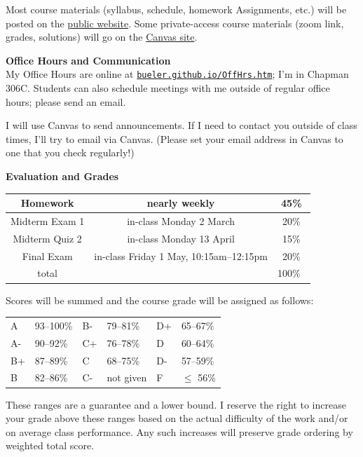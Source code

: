 \documentclass[12pt]{article}
\renewcommand{\emph}[1]{\textsf{\textbf{#1}}}
\newcommand{\localhead}[1]{\par\smallskip\textbf{#1} \smallskip\nobreak\\}%
\def\heading#1{\localhead{\large\emph{#1}}}
\begin{document}
Most course materials (syllabus, schedule, homework Assignments, etc.) will be posted on the \href{https://bueler.github.io/fa/}{public website}.  Some private-access course materials (zoom link, grades, solutions) will go on the \href{https://canvas.alaska.edu/courses/30068}{Canvas site}.


\heading{Office Hours and Communication}
My Office Hours are online at \href{http://bueler.github.io/OffHrs.htm}{\texttt{bueler.github.io/OffHrs.htm}}; I'm in Chapman 306C.  Students can also schedule meetings with me outside of regular office hours; please send an email.

I will use Canvas to send announcements.  If I need to contact you outside of class times, I'll try to email via Canvas.  (Please set your email address in Canvas to one that you check regularly!)


\clearpage\newpage
\phantom{foo}
\vskip -20pt

\heading{Evaluation and Grades}

\begin{tabular}{|c|c|c|}
\hline
Homework & nearly weekly & {\color{red} 45\%} \\
\hline
Midterm Exam 1 & in-class Monday 2 March  & 20\%  \\
\hline
Midterm {\color{red} Quiz} 2 & in-class Monday 13 April & {\color{red} 15\%}  \\
\hline
Final Exam     & in-class Friday 1 May, 10:15am--12:15pm & 20\% \\
\hline
total & & 100\% \, \\
\hline
\end{tabular}

Scores will be summed and the course grade will be assigned as follows:

\begin{tabular}{llllll}
A  & 93--100\% & B- & 79--81\%  & D+ & 65--67\%  \\
A- & 90--92\%  & C+ & 76--78\%  & D  & 60--64\%  \\
B+ & 87--89\%  & C  & 68--75\%  & D- & 57--59\%  \\
B  & 82--86\%  & C- & not given & F  & $\le$ 56\%
\end{tabular}

These ranges are a guarantee and a lower bound.  I reserve the right to increase your grade above these ranges based on the actual difficulty of the work and/or on average class performance.  Any such increases will preserve grade ordering by weighted total score.
\end{document}
